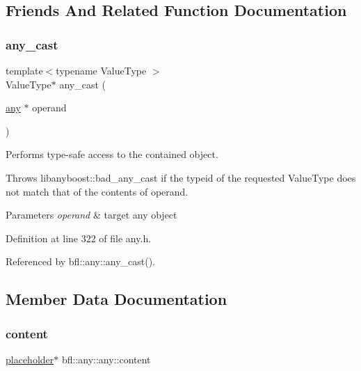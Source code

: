 \subsection{Friends And Related Function Documentation}
\mbox{\label{classbfl_1_1any_1_1any_a9d1312e2ae8ed7cf8cc7c93d4c6d1422}} 
\subsubsection{\texorpdfstring{any\+\_\+cast}{any\_cast}}
{\footnotesize\ttfamily template$<$typename Value\+Type $>$ \\
Value\+Type$\ast$ any\+\_\+cast (\begin{DoxyParamCaption}\item[{\mbox{\hyperlink{classbfl_1_1any_1_1any}{any}} $\ast$}]{operand }\end{DoxyParamCaption})\hspace{0.3cm}{\ttfamily [friend]}}



Performs type-\/safe access to the contained object. 

Throws libanyboost\+::bad\+\_\+any\+\_\+cast if the typeid of the requested Value\+Type does not match that of the contents of operand.


\begin{DoxyParams}{Parameters}
{\em operand} & target any object \\
\hline
\end{DoxyParams}


Definition at line 322 of file any.\+h.



Referenced by bfl\+::any\+::any\+\_\+cast().



\subsection{Member Data Documentation}
\mbox{\label{classbfl_1_1any_1_1any_a3b81eea753ab84d245b0b360bcb38540}} 
\subsubsection{\texorpdfstring{content}{content}}
{\footnotesize\ttfamily \mbox{\hyperlink{classbfl_1_1any_1_1any_1_1placeholder}{placeholder}}$\ast$ bfl\+::any\+::any\+::content\hspace{0.3cm}{\ttfamily [private]}}



